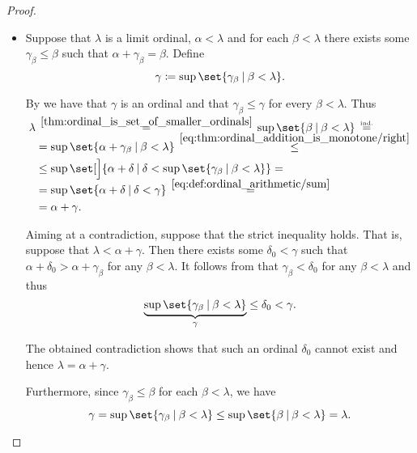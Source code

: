 \begin{proof}
\begin{itemize}
    \item Suppose that \( \lambda \) is a limit ordinal, \( \alpha < \lambda \) and for each \( \beta < \lambda \) there exists some \( \gamma_\beta \leq \beta \) such that \( \alpha + \gamma_\beta = \beta \). Define
    \begin{equation*}
      \gamma \coloneqq \sup\set{ \gamma_\beta \given \beta < \lambda }.
    \end{equation*}

    By  we have that \( \gamma \) is an ordinal and that \( \gamma_\beta \leq \gamma \) for every \( \beta < \lambda \). Thus
    \begin{align*}
      \lambda
      &\reloset {\ref{thm:ordinal_is_set_of_smaller_ordinals}} =
      \sup\set{ \beta \given \beta < \lambda }
      \reloset {\T{ind.}} = \\ &=
      \sup\set{ \alpha + \gamma_\beta \given \beta < \lambda }
      \reloset {\eqref{eq:thm:ordinal_addition_is_monotone/right}} \leq \\ &\leq
      \sup\set[\Big]{ \alpha + \delta \given \delta < \sup\set{ \gamma_\beta \given \beta < \lambda } }
      = \\ &=
      \sup\set{ \alpha + \delta \given \delta < \gamma }
      \reloset {\eqref{eq:def:ordinal_arithmetic/sum}} = \\ &=
      \alpha + \gamma.
    \end{align*}

    Aiming at a contradiction, suppose that the strict inequality holds. That is, suppose that \( \lambda < \alpha + \gamma \). Then there exists some \( \delta_0 < \gamma \) such that \( \alpha + \delta_0 > \alpha + \gamma_\beta \) for any \( \beta < \lambda \). It follows from  that \( \gamma_\beta < \delta_0 \) for any \( \beta < \lambda \) and thus
    \begin{equation*}
      \underbrace{\sup\set{ \gamma_\beta \given \beta < \lambda }}_{\gamma} \leq \delta_0 < \gamma.
    \end{equation*}

    The obtained contradiction shows that such an ordinal \( \delta_0 \) cannot exist and hence \( \lambda = \alpha + \gamma \).

    Furthermore, since \( \gamma_\beta \leq \beta \) for each \( \beta < \lambda \), we have
    \begin{equation*}
      \gamma
      =
      \sup\set{ \gamma_\beta \given \beta < \lambda }
      \leq
      \sup\set{ \beta \given \beta < \lambda }
      =
      \lambda.
    \end{equation*}
  \end{itemize}


\end{proof}
